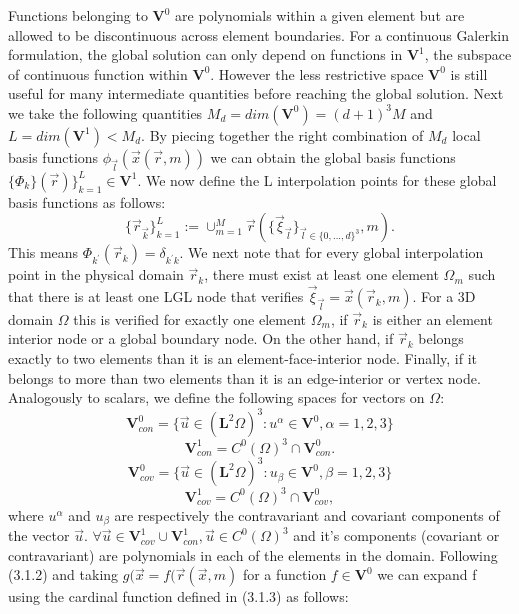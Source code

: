 \documentclass{report}
\numberwithin{equation}{section}
\begin{document}
Functions belonging to $\mathbf{V}^0$ are polynomials within a given element but are allowed to be discontinuous across element boundaries. For a continuous Galerkin formulation, the global solution can only depend on functions in $\mathbf{V}^1$, the subspace of continuous function within $\mathbf{V}^0$. However the less restrictive space $\mathbf{V}^0$ is still useful for many intermediate quantities before reaching the global solution. Next we take the following quantities $M_d = dim(\mathbf{V}^0) = (d+1)^3M$ and $L = dim(\mathbf{V}^1) < M_d$. By piecing together the right combination of $M_d$ local basis functions $\phi_{\overrightarrow{l}}(\overrightarrow{x}(\overrightarrow{r},m))$ we can obtain the global basis functions $\{\Phi_k\}(\overrightarrow{r})\}_{k=1}^L \in \mathbf{V}^1$. We now define the L interpolation points for these global basis functions as follows:
\begin{equation}
    \{\overrightarrow{r}_{\overrightarrow{k}}\}_{k=1}^L:= \cup_{m=1}^M \overrightarrow{r}(\{\overrightarrow{\xi}_{\overrightarrow{l}}\}_{\overrightarrow{l}\in\{0,...,d\}^3},m).
\end{equation}
This means $\Phi_{k^{'}}(\overrightarrow{r}_k) = \delta_{k^{'} k}$. We next note that for every global interpolation point in the physical domain $\overrightarrow{r}_{k}$, there must exist at least one element $\Omega_m$ such that there is at least one LGL node that verifies $\overrightarrow{\xi}_{\overrightarrow{l}}=\overrightarrow{x}(\overrightarrow{r}_k,m)$. For a 3D domain $\Omega$ this is verified for exactly one element $\Omega_m$, if $\overrightarrow{r}_k$ is either an element interior node or a global boundary node. On the other hand, if $\overrightarrow{r}_k$ belongs exactly to two elements than it is an element-face-interior node. Finally, if it belongs to more than two elements than it is an edge-interior or vertex node.
Analogously to scalars, we define the following spaces for vectors on $\Omega$:
\begin{equation}
\mathbf{V}_{con}^0 = \{\overrightarrow{u}\in(\mathbf{L}^2\Omega)^3:u^{\alpha}\in \mathbf{V}^0, \alpha=1,2,3\}
\end{equation}
\begin{equation}
    \mathbf{V}_{con}^1 = C^0(\Omega)^3\cap \mathbf{V}_{con}^0.
\end{equation}
\begin{equation}
\mathbf{V}_{cov}^0 = \{\overrightarrow{u}\in(\mathbf{L}^2\Omega)^3:u_{\beta}\in \mathbf{V}^0, \beta=1,2,3\}
\end{equation}
\begin{equation}
    \mathbf{V}_{cov}^1 = C^0(\Omega)^3\cap \mathbf{V}_{cov}^0,
\end{equation}
where $u^{\alpha}$ and $u_{\beta}$ are respectively the contravariant and covariant components of the vector $\overrightarrow{u}$. $\forall \overrightarrow{u} \in \mathbf{V}_{cov}^1 \cup \mathbf{V}_{con}^1, \overrightarrow{u}  \in C^0(\Omega)^3$ and it's components (covariant or contravariant) are polynomials in each of the elements in the domain.
Following (3.1.2) and taking $g(\overrightarrow{x}=f(\overrightarrow{r}(\overrightarrow{x},m)$ for a function $f \in \mathbf{V}^0$ we can expand f using the cardinal function defined in (3.1.3) as follows:
\end{document}
